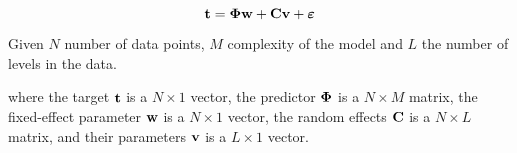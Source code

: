 \begin{equation}
 \mathbf{t} = \mathbf{\Phi w} + \mathbf{C v}  + \bm{\varepsilon}
\end{equation}

Given $N$ number of data points, $M$ complexity of the model and $L$ the number of levels in the data.

where the target $\mathbf{t}$ is a $N \times 1$ vector, the predictor $\mathbf{\Phi}$ is a $N \times M$ matrix, the fixed-effect parameter $\mathbf{w}$ is a $N \times 1$ vector, the random effects $\mathbf{C}$ is a $N \times L$ matrix, and their parameters $\mathbf{v}$ is a $L \times 1$ vector.




